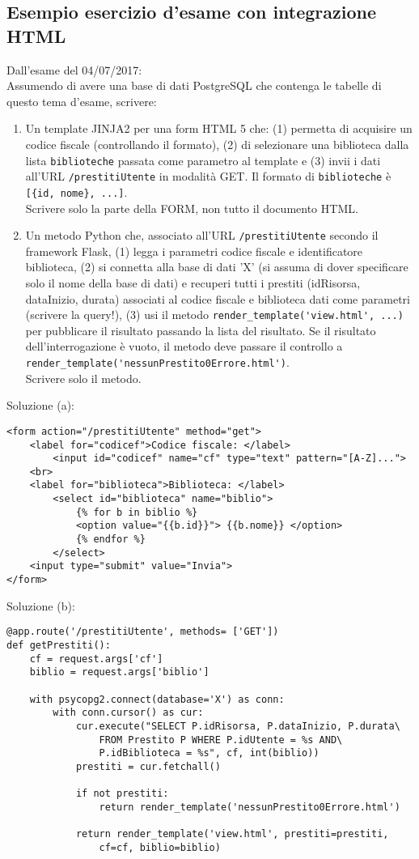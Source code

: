 \documentclass[a4paper, 10pt, titlepage]{article}
\begin{document}
		\subsection{Esempio esercizio d'esame con integrazione HTML}
			Dall'esame del 04/07/2017:\\		
			Assumendo di avere una base di dati PostgreSQL che contenga le tabelle di questo tema d'esame, scrivere:
			\begin{enumerate}[label=(\alph*)]
				\item Un template JINJA2 per una form HTML 5 che: (1) permetta di acquisire un codice fiscale (controllando il formato), (2) di selezionare una biblioteca dalla lista \lstinline|biblioteche| passata come parametro al template e (3) invii i dati all'URL \lstinline|/prestitiUtente| in modalità GET. Il formato di \lstinline|biblioteche| è \lstinline|[{id, nome}, ...]|.\\
				Scrivere solo la parte della FORM, non tutto il documento HTML. 
				
				\item Un metodo Python che, associato all'URL \lstinline|/prestitiUtente| secondo il framework Flask, (1) legga i parametri codice fiscale e identificatore biblioteca, (2) si connetta alla base di dati 'X' (si assuma di dover specificare solo il nome della base di dati) e recuperi tutti i prestiti (idRisorsa, dataInizio, durata) associati al codice fiscale e biblioteca dati come parametri (scrivere la query!), (3) usi il metodo \lstinline|render_template('view.html', ...)| per pubblicare il risultato passando la lista del risultato. Se il  risultato dell'interrogazione è vuoto, il metodo deve passare il controllo a \lstinline|render_template('nessunPrestito0Errore.html')|.\\
				Scrivere solo il metodo.
			\end{enumerate}
			Soluzione (a):
			\lstset{language=HTML}
			\begin{lstlisting}[frame=tb, tabsize=2]
<form action="/prestitiUtente" method="get">
	<label for="codicef">Codice fiscale: </label>
		<input id="codicef" name="cf" type="text" pattern="[A-Z]...">
	<br>
	<label for="biblioteca">Biblioteca: </label>
		<select id="biblioteca" name="biblio">
			{% for b in biblio %}
			<option value="{{b.id}}"> {{b.nome}} </option>
			{% endfor %}
		</select>
	<input type="submit" value="Invia">
</form>
			\end{lstlisting}
			Soluzione (b):
			\lstset{language=Python}
			\begin{lstlisting}[frame=tb, tabsize=2]
@app.route('/prestitiUtente', methods= ['GET'])
def getPrestiti():
	cf = request.args['cf']
	biblio = request.args['biblio']
	
	with psycopg2.connect(database='X') as conn:
		with conn.cursor() as cur:
			cur.execute("SELECT P.idRisorsa, P.dataInizio, P.durata\
				FROM Prestito P WHERE P.idUtente = %s AND\
				P.idBiblioteca = %s", cf, int(biblio))
			prestiti = cur.fetchall()
			
			if not prestiti:
				return render_template('nessunPrestito0Errore.html')
				
			return render_template('view.html', prestiti=prestiti, 
				cf=cf, biblio=biblio)
			\end{lstlisting}
			
\end{document}

